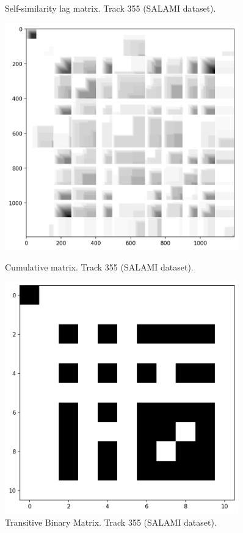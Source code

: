 \begin{figure}[ht]
\begin{minipage}{0.45\textwidth}
        \caption[Track 355 (SALAMI dataset) Self-similarity lag matrix]{Self-similarity lag matrix. Track 355 (SALAMI dataset).}
    \end{minipage}
    \vfill
    \begin{minipage}{0.45\textwidth}
        \centering
        \includegraphics[width=0.9\textwidth]{figures/images/355cumulativematrix.png} %
        \caption[Track 355 (SALAMI dataset). Q-matrix]{Cumulative matrix. Track 355 (SALAMI dataset).}
    \end{minipage}\hfill
    \begin{minipage}{0.45\textwidth}
        \centering
        \includegraphics[width=0.9\textwidth]{figures/images/355transitivebinarysimilaritymatrix.png} %
        \caption[Track 355 (SALAMI dataset). Transitive Binary Similarity Matrix]{Transitive Binary Matrix. Track 355 (SALAMI dataset).}
    \end{minipage}
\end{figure}

